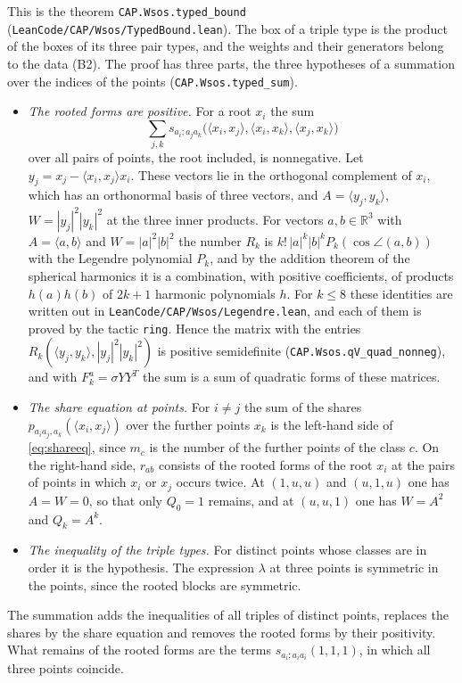 \documentclass[reqno,a4paper,11pt]{amsart}
\numberwithin{equation}{section}
\def\R{{\mathbb R}}
\newcommand{\lean}[1]{\texttt{#1}}
\newcommand{\file}[1]{\nolinkurl{#1}}
\begin{document}
This is the theorem \lean{CAP.Wsos.typed\_bound} (\file{LeanCode/CAP/Wsos/TypedBound.lean}). The box of a triple type is the product of the boxes of its three pair types, and the weights and their generators belong to the data (B2). The proof has three parts, the three hypotheses of a summation over the indices of the points (\lean{CAP.Wsos.typed\_sum}).
\begin{itemize}
    \item \emph{The rooted forms are positive.} For a root $x_i$ the sum
    $$
    \sum_{j,k} s_{a_i; a_j a_k}\big(\langle x_i, x_j \rangle, \langle x_i, x_k \rangle, \langle x_j, x_k \rangle\big)
    $$
    over all pairs of points, the root included, is nonnegative. Let $y_j = x_j - \langle x_i, x_j \rangle x_i$. These vectors lie in the orthogonal complement of $x_i$, which has an orthonormal basis of three vectors, and $A = \langle y_j, y_k \rangle$, $W = |y_j|^2 |y_k|^2$ at the three inner products. For vectors $a, b \in \R^3$ with $A = \langle a, b \rangle$ and $W = |a|^2 |b|^2$ the number $R_k$ is $k! \, |a|^k |b|^k P_k(\cos \angle(a,b))$ with the Legendre polynomial $P_k$, and by the addition theorem of the spherical harmonics it is a combination, with positive coefficients, of products $h(a) h(b)$ of $2k+1$ harmonic polynomials $h$. For $k \leq 8$ these identities are written out in \file{LeanCode/CAP/Wsos/Legendre.lean}, and each of them is proved by the tactic \texttt{ring}. Hence the matrix with the entries $R_k(\langle y_j, y_k \rangle, |y_j|^2 |y_k|^2)$ is positive semidefinite (\lean{CAP.Wsos.qV\_quad\_nonneg}), and with $F^a_k = \sigma Y Y^T$ the sum is a sum of quadratic forms of these matrices.
    \item \emph{The share equation at points.} For $i \neq j$ the sum of the shares $p_{a_i a_j, a_k}(\langle x_i, x_j \rangle)$ over the further points $x_k$ is the left-hand side of \eqref{eq:shareeq}, since $m_c$ is the number of the further points of the class $c$. On the right-hand side, $r_{ab}$ consists of the rooted forms of the root $x_i$ at the pairs of points in which $x_i$ or $x_j$ occurs twice. At $(1, u, u)$ and $(u, 1, u)$ one has $A = W = 0$, so that only $Q_0 = 1$ remains, and at $(u, u, 1)$ one has $W = A^2$ and $Q_k = A^k$.
    \item \emph{The inequality of the triple types.} For distinct points whose classes are in order it is the hypothesis. The expression $\lambda$ at three points is symmetric in the points, since the rooted blocks are symmetric.
\end{itemize}
The summation adds the inequalities of all triples of distinct points, replaces the shares by the share equation and removes the rooted forms by their positivity. What remains of the rooted forms are the terms $s_{a_i;a_i a_i}(1,1,1)$, in which all three points coincide.
\end{document}
